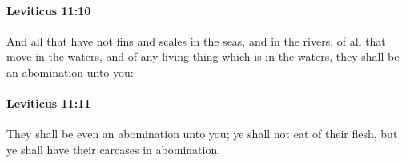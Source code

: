 		\paragraph{Leviticus 11:10} %
			\label{LEVITICUS-11-10}

			And all that have not fins and scales in the seas, and in the rivers, of all that move in the waters, and of any living thing which is in the waters, they shall be an abomination unto you:


		\paragraph{Leviticus 11:11} %
			\label{LEVITICUS-11-11}

			They shall be even an abomination unto you; ye shall not eat of their flesh, but ye shall have their carcases in abomination.


